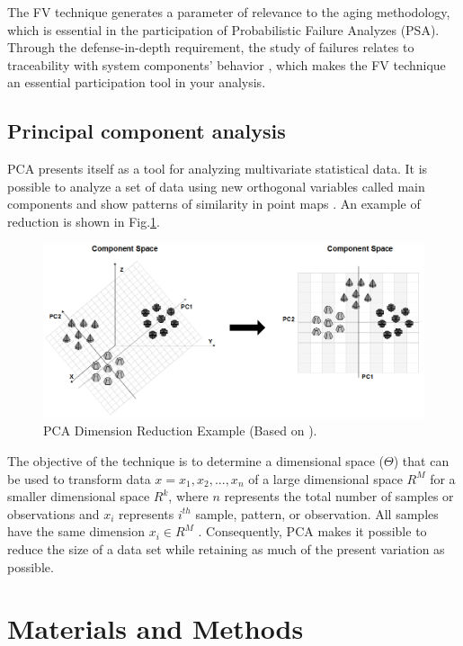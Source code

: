 \documentclass{ws-m3as}
\begin{document}
The FV technique generates a parameter of relevance to the aging methodology, which is essential in the participation of Probabilistic Failure Analyzes (PSA). Through the defense-in-depth requirement, the study of failures relates to traceability with system components' behavior \cite{vanderBorst2001}, which makes the FV technique an essential participation tool in your analysis.

\subsection{Principal component analysis}

PCA presents itself as a tool for analyzing multivariate statistical data. It is possible to analyze a set of data using new orthogonal variables called main components and show patterns of similarity in point maps \cite{Mishra2017}. An example of reduction is shown in Fig.\ref{fig:5}.

\begin{figure}[H]
	\centering 
	\includegraphics[width=0.9\linewidth]{Figures/PCAExample2}
	\caption{PCA Dimension Reduction Example (Based on \protect\cite{Adcock2015}).}
	\label{fig:5}
\end{figure}

The objective of the technique is to determine a dimensional space ($\Theta$) that can be used to transform data $x={x_{1},x_{2},...,x_{n}}$ of a large dimensional space $R^{M}$ for a smaller dimensional space $R^{k}$, where $n$ represents the total number of samples or observations and $x_{i}$ represents $i^{th}$ sample, pattern, or observation. All samples have the same dimension $x_{i} \in R^{M}$ \cite{Tharwat2016}. Consequently, PCA makes it possible to reduce the size of a data set while retaining as much of the present variation as possible.

\section{Materials and Methods}
\end{document}
